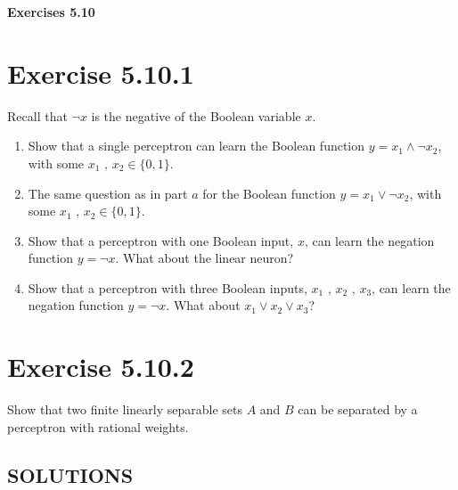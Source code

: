 \documentclass{exam}
\begin{document}
\begin{center}
    \textbf{\Large Exercises 5.10 }
\end{center}

\section*{Exercise 5.10.1}
Recall that $\neg x$ is the negative of the Boolean variable $x$. 
\begin{enumerate}
    \item Show that a single perceptron can learn the Boolean function $y = x_{1}\land \neg x_{2}$, with some $x_{1} \text{ , } x_{2} \in \{0,1\}$.
    \item The same question as in part $a$ for the Boolean function $y = x_{1}\lor \neg x_{2}$, with some $x_{1} \text{ , } x_{2} \in \{0,1\}$.
    \item Show that a perceptron with one Boolean input, $x$, can learn the negation function $y = \neg x$. What about the linear neuron?
    \item Show that a perceptron with three Boolean inputs, $x_{1} \text{ , } x_{2} \text{ , } x_3$, can learn the negation function $y = \neg x$. What about $x_1 \lor x_2 \lor x_3$?
\end{enumerate}

\section*{Exercise 5.10.2}
Show that two finite linearly separable sets $A$ and $B$ can be separated by a perceptron with rational weights. 


\newpage

\begin{center}    
    \section*{SOLUTIONS}
\end{center}
\end{document}
